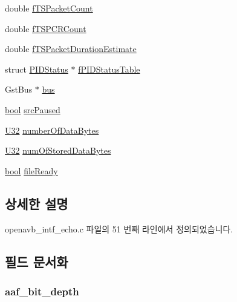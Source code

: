 \begin{DoxyCompactItemize}
\item 
double \hyperlink{structpvt__data__t_a45ba86fdef1b64912c361671d4979627}{f\+T\+S\+Packet\+Count}
\item 
double \hyperlink{structpvt__data__t_a5e3477b3086ecf8bf79af7468ffa91b6}{f\+T\+S\+P\+C\+R\+Count}
\item 
double \hyperlink{structpvt__data__t_a0511da20763f2bbf2d7ad805c6a9bdd4}{f\+T\+S\+Packet\+Duration\+Estimate}
\item 
struct \hyperlink{struct_p_i_d_status}{P\+I\+D\+Status} $\ast$ \hyperlink{structpvt__data__t_a8fd6f0d5303b5c766d5fb591845862aa}{f\+P\+I\+D\+Status\+Table}
\item 
Gst\+Bus $\ast$ \hyperlink{structpvt__data__t_a8069191ff53f2617a832b3ae528ef11d}{bus}
\item 
\hyperlink{avb__gptp_8h_af6a258d8f3ee5206d682d799316314b1}{bool} \hyperlink{structpvt__data__t_a51b21ed47332ea9205cdf1e7546a630d}{src\+Paused}
\item 
\hyperlink{openavb__types__base__pub_8h_a696390429f2f3b644bde8d0322a24124}{U32} \hyperlink{structpvt__data__t_a9751877efbabcb0c1a9a58ede089da76}{number\+Of\+Data\+Bytes}
\item 
\hyperlink{openavb__types__base__pub_8h_a696390429f2f3b644bde8d0322a24124}{U32} \hyperlink{structpvt__data__t_aaace30e2d4f45024fd9d6e965b3ce99b}{num\+Of\+Stored\+Data\+Bytes}
\item 
\hyperlink{avb__gptp_8h_af6a258d8f3ee5206d682d799316314b1}{bool} \hyperlink{structpvt__data__t_abef6d85b9c0274f90263744089f8a2b1}{file\+Ready}
\end{DoxyCompactItemize}


\subsection{상세한 설명}


openavb\+\_\+intf\+\_\+echo.\+c 파일의 51 번째 라인에서 정의되었습니다.



\subsection{필드 문서화}
\subsubsection[{\texorpdfstring{aaf\+\_\+bit\+\_\+depth}{aaf_bit_depth}}]{ aaf\+\_\+bit\+\_\+depth}\hypertarget{structpvt__data__t_a3903fa1eba11d0c39392c3a1c981d3d1}{}\label{structpvt__data__t_a3903fa1eba11d0c39392c3a1c981d3d1}


